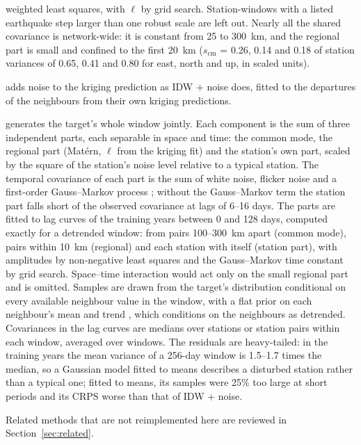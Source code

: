 \documentclass[preprint,12pt,authoryear]{elsarticle}
\begin{document}
\begin{description}
    weighted least squares, with $\ell$ by grid search. Station-windows with a listed
    earthquake step larger than one robust scale are left out. Nearly all the shared
    covariance is network-wide: it is constant from 25 to 300~km, and the regional part
    is small and confined to the first 20~km ($s_\mathrm{cm}$ = 0.26, 0.14 and 0.18 of
    station variances of 0.65, 0.41 and 0.80 for east, north and up, in scaled units).
  \item[Kriging + noise] adds noise to the kriging prediction as IDW + noise does, fitted
    to the departures of the neighbours from their own kriging predictions.
  \item[Space--time Gaussian process] generates the target's whole window jointly. Each
    component is the sum of three independent parts, each separable in space and time:
    the common mode, the regional part (Mat\'ern, $\ell$ from the kriging fit) and the
    station's own part, scaled by the square of the station's noise level relative to a
    typical station. The temporal covariance of each part is the sum of white noise,
    flicker noise and a first-order Gauss--Markov process
    \citep{williams2004,langbein2008}; without the Gauss--Markov term the station part
    falls short of the observed covariance at lags of 6--16 days. The parts are fitted to
    lag curves of the training years between 0 and 128 days, computed exactly for a
    detrended window: from pairs 100--300~km apart (common mode), pairs within 10~km
    (regional) and each station with itself (station part), with amplitudes by
    non-negative least squares and the Gauss--Markov time constant by grid search.
    Space--time interaction \citep{gneiting2002} would act only on the small regional
    part and is omitted. Samples are drawn from the target's distribution conditional on
    every available neighbour value in the window, with a flat prior on each neighbour's
    mean and trend \citep[eq.~2.42]{rasmussen2006}, which conditions on the neighbours as
    detrended. Covariances in the lag curves are medians over stations or station pairs
    within each window, averaged over windows. The residuals are heavy-tailed: in the
    training years the mean variance of a 256-day window is 1.5--1.7 times the median, so
    a Gaussian model fitted to means describes a disturbed station rather than a typical
    one; fitted to means, its samples were 25\% too large at short periods and its CRPS
    worse than that of IDW + noise.
\end{description}
Related methods that are not reimplemented here are reviewed in Section~\ref{sec:related}.
\end{document}
